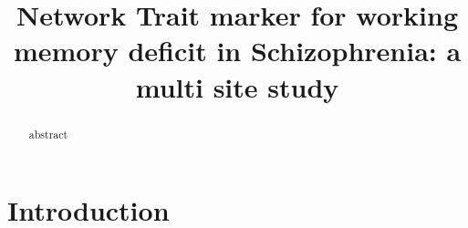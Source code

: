 \documentclass[preprint,authoryear,review,12pt,times]{elsarticle}
\begin{document}
\begin{frontmatter}

\title{Network Trait marker for working memory deficit in Schizophrenia: a multi site study
}



%






\begin{abstract} 
abstract
\end{abstract}

\begin{keyword}
\end{keyword}

\end{frontmatter}
%
%
\newpage



\pagewiselinenumbers
\linenumbers


\section*{Introduction}
\end{document}
